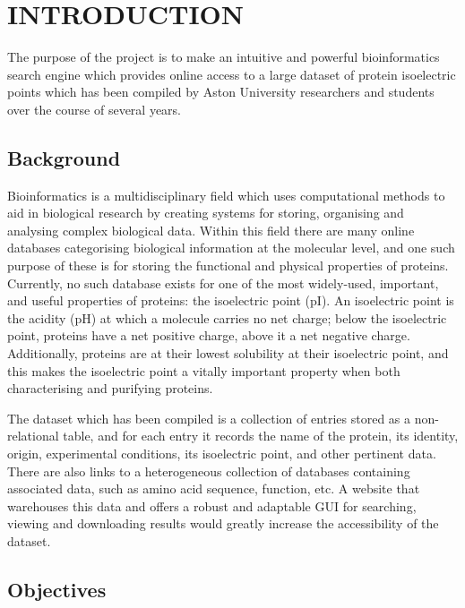 \section{INTRODUCTION \hrulefill}

The purpose of the project is to make an intuitive and powerful bioinformatics
search engine which provides online access to a large dataset of protein
isoelectric points which has been compiled by Aston University researchers and
students over the course of several years.

\subsection{Background}
Bioinformatics is a multidisciplinary field which uses computational methods to
aid in biological research by creating systems for storing, organising and
analysing complex biological data. Within this field there are many online
databases categorising biological information at the molecular level, and one
such purpose of these is for storing the functional and physical properties of
proteins. Currently, no such database exists for one of the most widely-used,
important, and useful properties of proteins: the isoelectric point (pI). An
isoelectric point is the acidity (pH) at which a molecule carries no net charge;
below the isoelectric point, proteins have a net positive charge, above it a net
negative charge. Additionally, proteins are at their lowest solubility at their
isoelectric point, and this makes the isoelectric point a vitally important
property when both characterising and purifying proteins.

The dataset which has been compiled is a collection of entries stored as a
non-relational table, and for each entry it records the name of the protein, its
identity, origin, experimental conditions, its isoelectric point, and other
pertinent data. There are also links to a heterogeneous collection of databases
containing associated data, such as amino acid sequence, function, etc. A
website that warehouses this data and offers a robust and adaptable GUI for
searching, viewing and downloading results would greatly increase the
accessibility of the dataset.

\subsection{Objectives}


